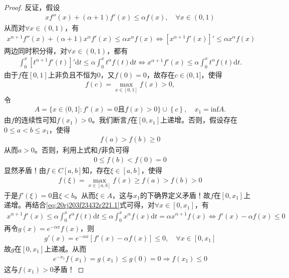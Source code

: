 \documentclass[../../main.tex]{subfiles}%
\begin{document}
\begin{proof}

反证，假设
\begin{align*}
xf''(x) + (\alpha + 1)f'(x) \leqslant \alpha f(x), \quad \forall x \in (0,1)
\end{align*}
从而对$\forall x \in (0,1)$，有
\begin{align*}
x^{\alpha + 1}f''(x) + (\alpha + 1)x^{\alpha}f'(x) \leqslant \alpha x^{\alpha}f(x) \Longleftrightarrow \left[ x^{\alpha + 1}f'(x) \right]' \leqslant \alpha x^{\alpha}f(x)
\end{align*}
两边同时积分得，对$\forall x \in (0,1)$，都有
\begin{align}
\int_0^x \left[ t^{\alpha + 1}f'(t) \right]' \mathrm{d}t \leqslant \alpha \int_0^x t^{\alpha}f(t) \mathrm{d}t \Longleftrightarrow x^{\alpha + 1}f'(x) \leqslant \alpha \int_0^x t^{\alpha}f(t) \mathrm{d}t .\label{eq:20rj203f23432r221.1}
\end{align}
由于$f$在$[0,1]$上非负且不恒为0，又$f(0) = 0$，故存在$c \in (0,1]$，使得
\begin{align*}
f(c) = \max_{x \in [0,1]} f(x) > 0,
\end{align*}
令
\begin{align*}
A=\{x\in (0,1]:f' (x)=0\text{且}f(x)>0\}\cup \left\{ c \right\} ,\quad x_1=\mathrm{inf}A.
\end{align*}
由$f$的连续性可知$f(x_1) > 0$。我们断言$f$在$[0,x_1]$上递增。否则，假设存在$0 \leqslant a < b \leqslant x_1$，使得
\begin{align*}
f(a) > f(b) \geqslant 0
\end{align*}
从而$a > 0$。否则，利用上式和$f$非负可得
\begin{align*}
0 \leqslant f(b) < f(0) = 0
\end{align*}
显然矛盾！由$f \in C[a,b]$知，存在$\xi \in [a,b]$，使得
\begin{align*}
f(\xi) = \max_{x \in [a,b]} f(x) \geqslant f(a) > f(b) > 0
\end{align*}
于是$f'(\xi) = 0$且$\xi < b$。从而$\xi \in A$，这与$x_1$的下确界定义矛盾！故$f$在$[0,x_1]$上递增。再结合\eqref{eq:20rj203f23432r221.1}式可得，对$\forall x \in [0,x_1]$，有
\begin{align*}
x^{\alpha + 1}f'(x) \leqslant \alpha \int_0^x t^{\alpha}f(t) \mathrm{d}t \leqslant \alpha \int_0^x x^{\alpha}f(x) \mathrm{d}t = \alpha x^{\alpha + 1}f(x) \Longleftrightarrow f'(x) - \alpha f(x) \leqslant 0
\end{align*}
再令$g(x) = e^{-\alpha x}f(x)$，则
\begin{align*}
g'(x) = e^{-\alpha x} \left[ f'(x) - \alpha f(x) \right] \leqslant 0, \quad \forall x \in [0,x_1]
\end{align*}
故$g$在$[0,x_1]$上递减。从而
\begin{align*}
e^{-x_1}f(x_1) = g(x_1) \leqslant g(0) = 0 \Longrightarrow f(x_1) \leqslant 0
\end{align*}
这与$f(x_1) > 0$矛盾！

\end{proof}
\end{document}
